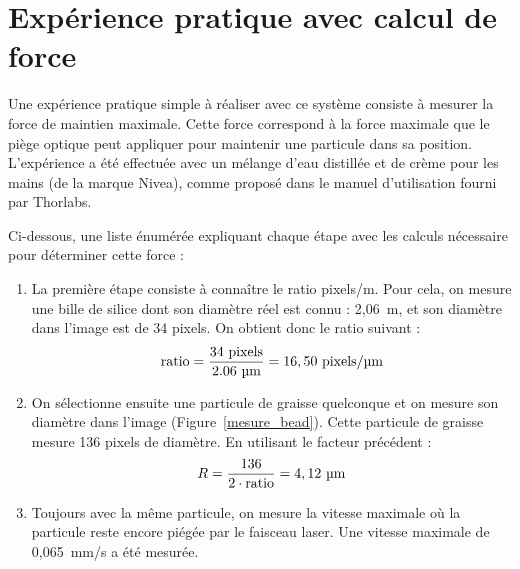 \section{Expérience pratique avec calcul de force}
Une expérience pratique simple à réaliser avec ce système consiste à mesurer la force de maintien maximale. Cette force correspond à la force maximale que le piège optique peut appliquer pour maintenir une particule dans sa position. L'expérience a été effectuée avec un mélange d'eau distillée et de crème pour les mains (de la marque Nivea), comme proposé dans le manuel d'utilisation fourni par Thorlabs.

Ci-dessous, une liste énumérée expliquant chaque étape avec les calculs nécessaire pour déterminer cette force :

\vspace{1em}
\begin{minipage}{0.6\textwidth}
    \begin{enumerate}
        \item La première étape consiste à connaître le ratio pixels/\textmu m. Pour cela, on mesure une bille de silice dont son diamètre réel est connu : 2,06~\textmu m, et son diamètre dans l'image est de 34 pixels. On obtient donc le ratio suivant :
              \[
                  \text{ratio} = \frac{34~\text{pixels}}{2.06~\text{\textmu m}} = 16,50~\text{pixels/\textmu m}
              \]
        \item On sélectionne ensuite une particule de graisse quelconque et on mesure son diamètre dans l'image (Figure~\ref{mesure_bead}). Cette particule de graisse mesure 136 pixels de diamètre. En utilisant le facteur précédent :
              \[
                  R = \frac{136}{2 \cdot \text{ratio}} = 4,12~\text{\textmu m}
              \]
        \item Toujours avec la même particule, on mesure la vitesse maximale où la particule reste encore piégée par le faisceau laser. Une vitesse maximale de 0,065~mm/s a été mesurée.
    \end{enumerate}
\end{minipage}
\hfill
